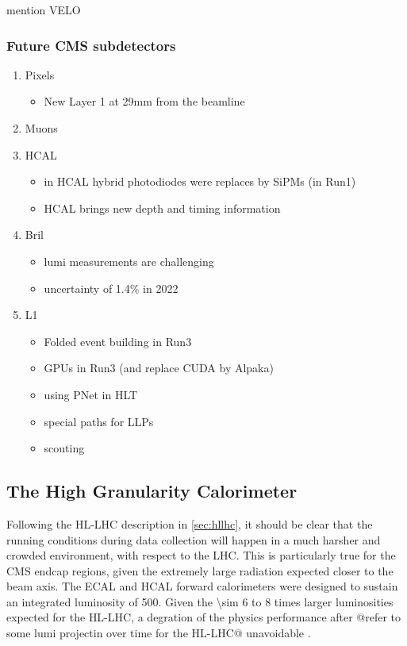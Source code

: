 \documentclass[11pt]{article}
\begin{document}
mention VELO

\cite{lhcb_hllhc_tdr,lhcb_hllhc_interest}
\subsubsection{Future CMS subdetectors}
\label{sec:org505a3ba}
\label{sec:hllhc_future_subdetectors.org}

\begin{enumerate}
\item Pixels
\label{sec:orgf8b9b0d}
\begin{itemize}
\item New Layer 1 at 29mm from the beamline
\end{itemize}
\item Muons
\label{sec:orgbd8cb18}
\item HCAL
\label{sec:orgd49103d}
\begin{itemize}
\item in HCAL hybrid photodiodes were replaces by SiPMs (in Run1)
\item HCAL brings new depth and timing information
\end{itemize}
\item Bril
\label{sec:orgf0c485b}
\begin{itemize}
\item lumi measurements are challenging
\item uncertainty of 1.4\% in 2022
\end{itemize}
\item L1
\label{sec:org123c16d}
\begin{itemize}
\item Folded event building in Run3
\item GPUs in Run3 (and replace CUDA by Alpaka)
\item using PNet in HLT
\item special paths for LLPs
\item scouting
\end{itemize}
\end{enumerate}
\subsection{The High Granularity Calorimeter}
\label{sec:org4cfeb33}
\label{sec:hgcal_intro}

Following the \ac{HL-LHC} description in \cref{sec:hllhc}, it should be clear that the running conditions during data collection will happen in a much harsher and crowded environment, with respect to the \ac{LHC}.
This is particularly true for the \ac{CMS} endcap regions, given the extremely large radiation expected closer to the beam axis.
The \ac{ECAL} and \ac{HCAL} forward calorimeters were designed to sustain an integrated luminosity of \SI{500}{\invfb}.
Given the \num{\sim 6} to \num{8} times larger luminosities expected for the \ac{HL-LHC}, a degration of the physics performance after @refer to some lumi projectin over time for the HL-LHC@ unavoidable \cite{hgcal_technical_proposal}.
\end{document}
